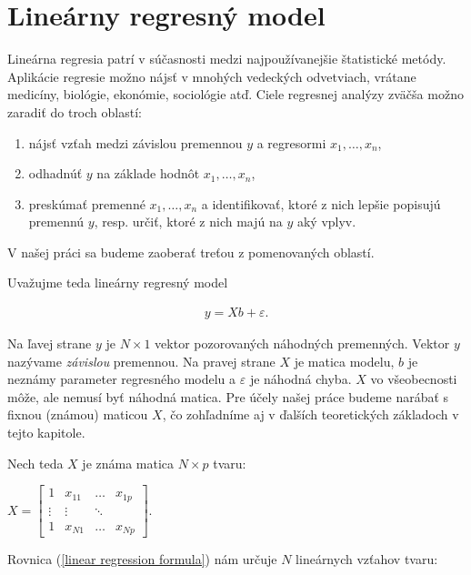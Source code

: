 \section{Lineárny regresný model}
\label{linear regression}
 
Lineárna regresia patrí v súčasnosti medzi najpoužívanejšie štatistické metódy. Aplikácie regresie možno nájsť v mnohých vedeckých odvetviach, 
vrátane medicíny, biológie, ekonómie, sociológie atď. Ciele regresnej analýzy zväčša možno zaradiť do troch oblastí:

\begin{enumerate}
  \item nájsť vzťah medzi závislou premennou $y$ a regresormi $x_1, \ldots, x_n$,
  \item odhadnúť $y$ na základe hodnôt $x_1, \ldots, x_n$,
  \item preskúmať premenné $x_1, \ldots, x_n$ a identifikovať, ktoré z nich lepšie popisujú premennú $y$, resp. určiť, ktoré z nich majú na $y$ aký vplyv.
\end{enumerate}

V našej práci sa budeme zaoberať treťou z pomenovaných oblastí.

Uvažujme teda lineárny regresný model

\begin{align}
\label{linear regression formula}
y = Xb + \varepsilon .
\end{align}

Na ľavej strane $y$ je $N \times 1$ vektor pozorovaných náhodných premenných. Vektor $y$ nazývame \emph{závislou} premennou.
Na pravej strane $X$ je matica modelu, $b$ je neznámy parameter regresného modelu a $\varepsilon$ je náhodná chyba.
$X$ vo všeobecnosti môže, ale nemusí byť náhodná matica. Pre účely našej práce budeme narábať s fixnou (známou) maticou $X$,
čo zohľadníme aj v ďalších teoretických základoch v tejto kapitole.

Nech teda $X$ je známa matica $N \times p$ tvaru:

\begin{center}
$
X =
\begin{bmatrix}
1 & x_{11} & \ldots & x_{1p} \\
\vdots & \vdots & \ddots & \\
1 & x_{N1} & \ldots & x_{Np} 
\end{bmatrix}
$.
\end{center}

Rovnica (\ref{linear regression formula}) nám určuje $N$ lineárnych vzťahov tvaru:

